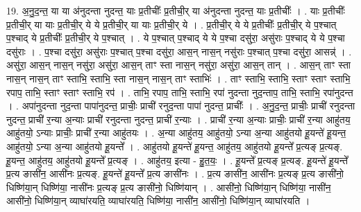 \documentclass[17pt]{extarticle}
\begin{document}
19. अ॒नु॒द॒न्त॒ या या अ॑नुदन्ता नुदन्त॒ याः प्र॒तीचीः᳚ प्र॒तीची॒र् या अ॑नुदन्ता नुदन्त॒ याः प्र॒तीचीः᳚ । . याः प्र॒तीचीः᳚ प्र॒तीची॒र् या याः प्र॒तीची॒र् ये ये प्र॒तीची॒र् या याः प्र॒तीची॒र् ये । . प्र॒तीची॒र् ये ये प्र॒तीचीः᳚ प्र॒तीची॒र् ये प॒श्चात् प॒श्चाद् ये प्र॒तीचीः᳚ प्र॒तीची॒र् ये प॒श्चात् । . ये प॒श्चात् प॒श्चाद् ये ये प॒श्चा दसु॑रा॒ असु॑राः प॒श्चाद् ये ये प॒श्चा दसु॑राः । . प॒श्चा दसु॑रा॒ असु॑राः प॒श्चात् प॒श्चा दसु॑रा॒ आस॒न् नास॒न् नसु॑राः प॒श्चात् प॒श्चा दसु॑रा॒ आसन्न्॑ । . असु॑रा॒ आस॒न् नास॒न् नसु॑रा॒ असु॑रा॒ आस॒न् ताꣳ स्ता नास॒न् नसु॑रा॒ असु॑रा॒ आस॒न् तान् । . आस॒न् ताꣳ स्ता नास॒न् नास॒न् ताꣳ स्ताभि॒ स्ताभि॒ स्ता नास॒न् नास॒न् ताꣳ स्ताभिः॑ । . ताꣳ स्ताभि॒ स्ताभि॒ स्ताꣳ स्ताꣳ स्ताभि॒ रपाप॒ ताभि॒ स्ताꣳ स्ताꣳ स्ताभि॒ रप॑ । . ताभि॒ रपाप॒ ताभि॒ स्ताभि॒ रपा॑ नुदन्ता नुद॒न्ताप॒ ताभि॒ स्ताभि॒ रपा॑नुदन्त । . अपा॑नुदन्ता नुद॒न्ता पापा॑नुदन्त॒ प्राचीः॒ प्राची॑ रनुद॒न्ता पापा॑ नुदन्त॒ प्राचीः᳚ । . अ॒नु॒द॒न्त॒ प्राचीः॒ प्राची॑ रनुदन्ता नुदन्त॒ प्राची॑ र॒न्या अ॒न्याः प्राची॑ रनुदन्ता नुदन्त॒ प्राची॑ र॒न्याः । . प्राची॑ र॒न्या अ॒न्याः प्राचीः॒ प्राची॑ र॒न्या आहु॑तय॒ आहु॑तयो॒ ऽन्याः प्राचीः॒ प्राची॑ र॒न्या आहु॑तयः । . अ॒न्या आहु॑तय॒ आहु॑तयो॒ ऽन्या अ॒न्या आहु॑तयो हू॒यन्ते॑ हू॒यन्त॒ आहु॑तयो॒ ऽन्या अ॒न्या आहु॑तयो हू॒यन्ते᳚ । . आहु॑तयो हू॒यन्ते॑ हू॒यन्त॒ आहु॑तय॒ आहु॑तयो हू॒यन्ते᳚ प्र॒त्यङ् प्र॒त्यङ्. हू॒यन्त॒ आहु॑तय॒ आहु॑तयो हू॒यन्ते᳚ प्र॒त्यङ् । . आहु॑तय॒ इत्या - हु॒त॒यः॒ । . हू॒यन्ते᳚ प्र॒त्यङ् प्र॒त्यङ्. हू॒यन्ते॑ हू॒यन्ते᳚ प्र॒त्य ङासी॑न॒ आसी॑नः प्र॒त्यङ्. हू॒यन्ते॑ हू॒यन्ते᳚ प्र॒त्य ङासी॑नः । . प्र॒त्य ङासी॑न॒ आसी॑नः प्र॒त्यङ् प्र॒त्य ङासी॑नो॒ धिष्णि॑या॒न् धिष्णि॑या॒ नासी॑नः प्र॒त्यङ् प्र॒त्य ङासी॑नो॒ धिष्णि॑यान् । . आसी॑नो॒ धिष्णि॑या॒न् धिष्णि॑या॒ नासी॑न॒ आसी॑नो॒ धिष्णि॑या॒न् व्याघा॑रयति॒ व्याघा॑रयति॒ धिष्णि॑या॒ नासी॑न॒ आसी॑नो॒ धिष्णि॑या॒न् व्याघा॑रयति । \newline
\end{document}

